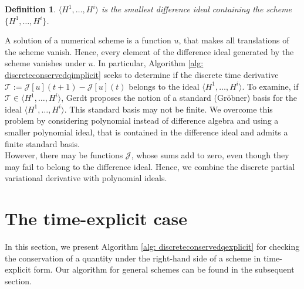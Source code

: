 \documentclass[sigconf,twocolumn]{acmart}
\newcommand{\1}{{\chi}}
\numberwithin{equation}{section}
\theoremstyle{thmlemcorr}
\numberwithin{theorem}{section}
\theoremstyle{thmlemcorr*}
\theoremstyle{defi}
\newtheorem{definition}[theorem]{Definition}
\theoremstyle{remexample}
\theoremstyle{ass}
\begin{document}
\begin{definition}
	$\langle H^1,\ldots,H^i\rangle$ is the smallest difference ideal containing the scheme $\{H^1,\ldots,H^i\}$.
\end{definition}
A solution of a numerical scheme is a function $u$, that makes all translations of the scheme vanish. Hence, every element of the difference ideal generated by the scheme vanishes under $u$.
In particular, Algorithm \ref{alg: discreteconservedqimplicit} seeks to determine if the discrete time derivative $\mathcal{T}:=\mathcal{J}[u](t+1)-\mathcal{J}[u](t)$ belongs to the ideal $\langle H^1,\ldots,H^i\rangle$. To examine, if $\mathcal{T}\in\langle H^1,\ldots,H^i\rangle$, Gerdt proposes the notion of a standard (Gr{\"o}bner) basis for the ideal $\langle H^1,\ldots,H^i\rangle$. This standard basis may not be finite. We overcome this problem by considering polynomial instead of difference algebra and using a smaller polynomial ideal, that is contained in the difference ideal and admits a finite standard basis.\\
However, there may be functions $\mathcal{J}$, whose sums add to zero, even though they may fail to belong to the difference ideal. Hence, we combine the discrete partial variational derivative with polynomial ideals.
\section{The time-explicit case}
\label{time-exp}
In this section, we present Algorithm \ref{alg: discreteconservedqexplicit}  for checking the conservation of a quantity under the right-hand side of a scheme in time-explicit form. Our algorithm for general schemes can be found in the subsequent section.
\end{document}
